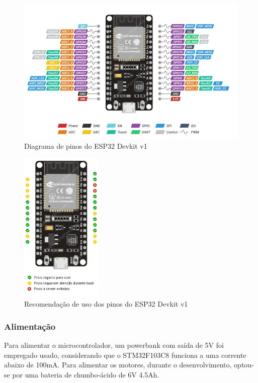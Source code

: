 \begin{figure}[htb]
	\centering
	\includegraphics[width=1.0\textwidth]{figures/esp32_pinout}
	\caption{Diagrama de pinos do ESP32 Devkit v1 \cite{esp32_reference}}
\end{figure}


\begin{figure}[htb]
	\centering
	\includegraphics[width=0.35\textwidth]{figures/esp32_pinout_ref}
	\caption{Recomendação de uso dos pinos do ESP32 Devkit v1 \cite{esp32_reference}}
\end{figure}


\subsubsection{Alimentação}
Para alimentar o microcontrolador, um powerbank com saída de 5V foi empregado usado, considerando que o STM32F103C8 
funciona a uma corrente abaixo de 100mA. Para alimentar os motores, durante o desenvolvimento, optou-se por uma 
bateria de chumbo-ácido de 6V 4.5Ah.


